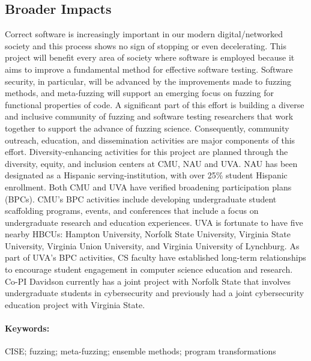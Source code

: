 \subsection*{Broader Impacts}
\vspace{-2mm}
Correct software is increasingly important in our modern digital/networked
society and this process shows no sign
of stopping or even decelerating.
This project will benefit every area of society where software is employed because it aims to improve a fundamental method for effective software testing.
Software security, in particular, will be advanced by the
improvements made to  fuzzing methods, and meta-fuzzing
will support an emerging focus on fuzzing for functional
properties of code.
A significant part of this effort is building a diverse and inclusive community of fuzzing and software testing researchers that work together to support the advance of fuzzing science.
Consequently, community outreach, education, and dissemination activities are major components of this effort.
Diversity-enhancing activities for this project are planned through
the diversity, equity, and inclusion centers at CMU, NAU and UVA.  NAU has been designated as a Hispanic serving-institution, with over 25\% student Hispanic enrollment.
Both CMU and UVA have verified broadening participation plans (BPCs).
CMU's BPC activities include developing undergraduate student scaffolding programs, events, and conferences that include a focus on undergraduate research and education experiences.
UVA is fortunate to have five nearby HBCUs: Hampton University, Norfolk State University, Virginia State University, Virginia Union University, and Virginia University of Lynchburg.
As part of UVA's BPC activities, CS faculty have established long-term relationships to encourage student engagement in computer science education and research.
Co-PI Davidson currently has a joint project with Norfolk State that involves undergraduate students in cybersecurity and previously had a joint cybersecurity education project with Virginia State.

\paragraph{Keywords:}
CISE; fuzzing; meta-fuzzing; ensemble methods; program transformations
